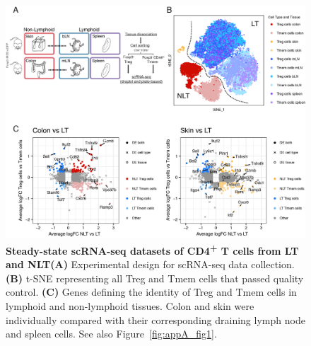 \begin{figure}[ht!] 
\centering    
\includegraphics[width=1.0\textwidth]{Chapter2/Figs/chap2_fig1.png} %
\caption[Steady-state scRNA-seq datasets of CD4\textsuperscript{+} T cells from LT and NLT]{\textbf{Steady-state scRNA-seq datasets of CD4\textsuperscript{+} T cells from LT and NLT}\newline\textbf{(A)} Experimental design for scRNA-seq data collection. \textbf{(B)} t-SNE representing all Treg and Tmem cells that passed quality control. \textbf{(C)} Genes defining the identity of Treg and Tmem cells in lymphoid and non-lymphoid tissues. Colon and skin were individually compared with their corresponding draining lymph node and spleen cells. See also Figure~\ref{fig:appA_fig1}.}
\label{fig:chap2_fig1}
\end{figure}

